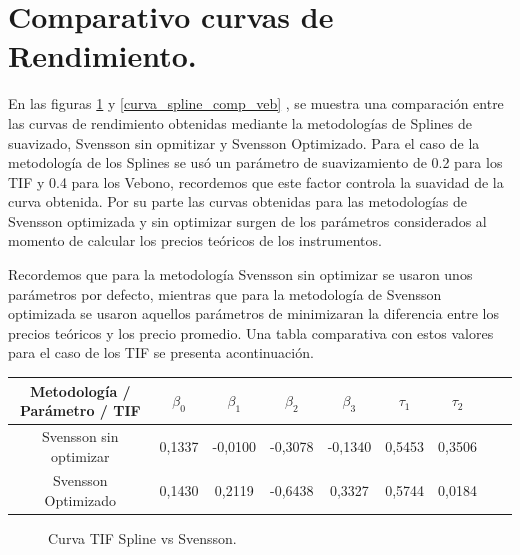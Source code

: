 \newpage

\section{Comparativo curvas de Rendimiento.}

\hspace{0.4cm} En las figuras \ref{curva_spline_comp_tif} y \ref{curva_spline_comp_veb} , se muestra una comparaci\'on entre las curvas de rendimiento obtenidas mediante la metodolog\'ias de Splines de suavizado, Svensson sin opmitizar y Svensson Optimizado.
Para el caso de la metodolog\'ia de los Splines se us\'o un par\'ametro de suavizamiento de 0.2 para los TIF y 0.4 para los Vebono, recordemos que este factor controla la suavidad de la curva obtenida. Por su parte las curvas obtenidas para las metodolog\'ias de Svensson optimizada y sin optimizar surgen de los par\'ametros considerados al momento de calcular los precios te\'oricos de los instrumentos.

\hspace{0.4cm}Recordemos que para la metodolog\'ia Svensson sin optimizar se usaron unos par\'ametros por defecto, mientras que para la metodolog\'ia de Svensson optimizada se usaron aquellos par\'ametros de minimizaran la diferencia entre los precios te\'oricos y los precio promedio. Una tabla comparativa  con estos valores para el caso de los TIF se presenta acontinuaci\'on.

\begin{center}
{\begin{tabular}[t]{|c |c |c |c |c |c |c |c |r|}
\hline
Metodolog\'ia / Par\'ametro / TIF & $\beta_{0}$ & $\beta_{1}$ & $\beta_{2}$ & $\beta_{3}$  &  $\tau_{1}$ & $\tau_{2}$ \\
\hline
Svensson sin optimizar & 0,1337 & -0,0100 & -0,3078 & -0,1340  & 0,5453 & 0,3506\\
\hline
Svensson Optimizado & 0,1430 & 0,2119 & -0,6438 & 0,3327 & 0,5744 & 0,0184 \\
\hline
\end{tabular}}
\end{center}


\newpage

\begin{figure}[h]
\caption{Curva TIF Spline vs Svensson.}
\label{curva_spline_comp_tif}
\end{figure}

